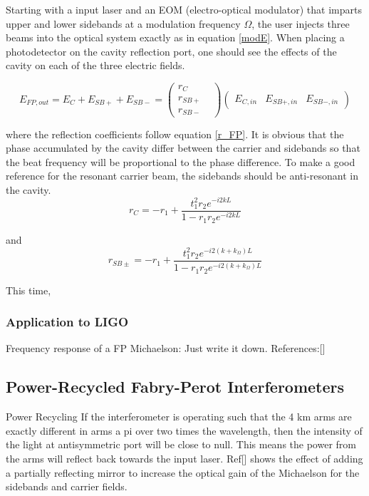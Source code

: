 		Starting with a input laser and an EOM (electro-optical modulator) that imparts upper and lower sidebands at a modulation frequency $\Omega$, the user injects three beams into the optical system exactly as in equation \ref{modE}.  When placing a photodetector on the cavity reflection port, one should see the effects of the cavity on each of the three electric fields.
		
		\begin{equation}
		E_{FP,out} = E_{C} + E_{SB+} + E_{SB-} = 
		\begin{pmatrix}
		r_{C} 	&   
		\\ 	r_{SB+} &
		\\ 	r_{SB-} &
		\end{pmatrix}
		\begin{pmatrix}
		E_{C,in} &    E_{SB+,in}    &  E_{SB-,in}     
		\end{pmatrix}
		\end{equation}
		
		where the reflection coefficients follow equation \ref{r_FP}.  It is obvious that the phase accumulated by the cavity differ between the carrier and sidebands so that the beat frequency will be proportional to the phase difference.  To make a good reference for the resonant carrier beam, the sidebands should be anti-resonant in the cavity.  
		\begin{equation}
		r_{C} = -r_1 + \frac{t_1^2 r_2  e^{-i2kL}}{1-r_1 r_2 e^{-i2kL}}
		\end{equation}
		
		and 
		\begin{equation}
		r_{SB\pm} = -r_1 + \frac{t_1^2 r_2  e^{-i2(k+k_{\Omega})L}}{1-r_1 r_2 e^{-i2(k+k_{\Omega})L}}
		\end{equation}
		
		This time, 
		
		\subsubsection{Application to LIGO}
		
		Frequency response of a FP Michaelson:
		Just write it down.
		References:[\cite{BlackSignalExtraction}]

		\subsection{Power-Recycled Fabry-Perot Interferometers}
		Power Recycling
		If the interferometer is operating such that the 4 km arms are exactly different in arms a pi over two times the wavelength, then the intensity of the light at antisymmetric port will be close to null.  This means the power from the arms will reflect back towards the input laser.  Ref[] shows the effect of adding a partially reflecting mirror to increase the optical gain of the Michaelson for the sidebands and carrier fields.
		
